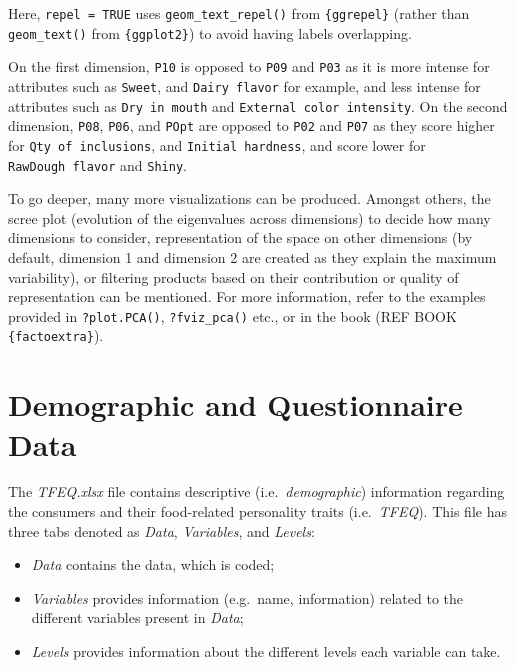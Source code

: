 \documentclass[
]{book}
\providecommand{\tightlist}{%
  \setlength{\itemsep}{0pt}\setlength{\parskip}{0pt}}
\begin{document}
Here, \texttt{repel\ =\ TRUE} uses \texttt{geom\_text\_repel()} from \texttt{\{ggrepel\}} (rather than \texttt{geom\_text()} from \texttt{\{ggplot2\}}) to avoid having labels overlapping.

On the first dimension, \texttt{P10} is opposed to \texttt{P09} and \texttt{P03} as it is more intense for attributes such as \texttt{Sweet}, and \texttt{Dairy\ flavor} for example, and less intense for attributes such as \texttt{Dry\ in\ mouth} and \texttt{External\ color\ intensity}. On the second dimension, \texttt{P08}, \texttt{P06}, and \texttt{POpt} are opposed to \texttt{P02} and \texttt{P07} as they score higher for \texttt{Qty\ of\ inclusions}, and \texttt{Initial\ hardness}, and score lower for \texttt{RawDough\ flavor} and \texttt{Shiny}.

To go deeper, many more visualizations can be produced. Amongst others, the scree plot (evolution of the eigenvalues across dimensions) to decide how many dimensions to consider, representation of the space on other dimensions (by default, dimension 1 and dimension 2 are created as they explain the maximum variability), or filtering products based on their contribution or quality of representation can be mentioned. For more information, refer to the examples provided in \texttt{?plot.PCA()}, \texttt{?fviz\_pca()} etc., or in the book (REF BOOK \texttt{\{factoextra\}}).

\hypertarget{demographic-and-questionnaire-data}{%
\section{Demographic and Questionnaire Data}\label{demographic-and-questionnaire-data}}

The \emph{TFEQ.xlsx} file contains descriptive (i.e.~\emph{demographic}) information regarding the consumers and their food-related personality traits (i.e.~\emph{TFEQ}). This file has three tabs denoted as \emph{Data}, \emph{Variables}, and \emph{Levels}:

\begin{itemize}
\tightlist
\item
  \emph{Data} contains the data, which is coded;
\item
  \emph{Variables} provides information (e.g.~name, information) related to the different variables present in \emph{Data};
\item
  \emph{Levels} provides information about the different levels each variable can take.
\end{itemize}
\end{document}

